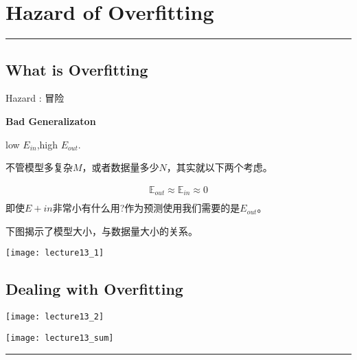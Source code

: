 \section{Hazard of Overfitting}
\noindent
{\color{LightRubineRed} \rule{\linewidth}{1mm} }
\subsection{What is Overfitting} %
\label{sub:what_is_overfitting}
\textcolor{mypink2}{Hazard} : 冒险 \par
\textbf{Bad Generalizaton} \par
low $E_{in}$,high $E_{out}$. \par
\begin{myremark}{}
不管模型多复杂$M$，或者数据量多少$N$，其实就以下两个考虑。 \par
\begin{align*}
\mathbb{E}_{out} \approx \mathbb{E}_{in} \approx 0 \\
\end{align*}
即使$E+{in}$非常小有什么用?作为预测使用我们需要的是$E_{out}$。
\end{myremark}
下图揭示了模型大小，与数据量大小的关系。 \par
\begin{center}
\texttt{[image: lecture13\_1]}\\
\end{center}

\subsection{Dealing with Overfitting} %
\label{sub:dealing_with_overfitting}
\begin{center}
\texttt{[image: lecture13\_2]}\\
\end{center}
\begin{center}
\texttt{[image: lecture13\_sum]}\\
\end{center}
\noindent
{\color{RubineRed} \rule{\linewidth}{1mm} }